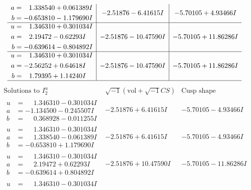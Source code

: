 \documentclass[1p]{elsarticle_modified}
\theoremstyle{definition}
\newcommand{\I}{\sqrt{-1}}
\begin{document}
$$\begin{array}{c|c|c}
\begin{aligned}
a &= \phantom{-}1.338540 + 0.061389 I \\
b &= -0.653810 - 1.179690 I\end{aligned}
 & -2.51876 - 6.41615 I & -5.70105 + 4.93466 I \\ \hline\begin{aligned}
u &= \phantom{-}1.346310 + 0.301034 I \\
a &= \phantom{-}2.19472 - 0.62293 I \\
b &= -0.639614 - 0.804892 I\end{aligned}
 & -2.51876 - 10.47590 I & -5.70105 + 11.86286 I \\ \hline\begin{aligned}
u &= \phantom{-}1.346310 + 0.301034 I \\
a &= -2.56252 + 0.64618 I \\
b &= \phantom{-}1.79395 + 1.14240 I\end{aligned}
 & -2.51876 - 10.47590 I & -5.70105 + 11.86286 I\\
 \hline 
 \end{array}$$\newpage$$\begin{array}{c|c|c}  
\text{Solutions to }I^u_{2}& \I (\text{vol} + \sqrt{-1}CS) & \text{Cusp shape}\\
 \hline 
\begin{aligned}
u &= \phantom{-}1.346310 - 0.301034 I \\
a &= -1.134500 - 0.245507 I \\
b &= \phantom{-}0.368928 - 0.011255 I\end{aligned}
 & -2.51876 + 6.41615 I & -5.70105 - 4.93466 I \\ \hline\begin{aligned}
u &= \phantom{-}1.346310 - 0.301034 I \\
a &= \phantom{-}1.338540 - 0.061389 I \\
b &= -0.653810 + 1.179690 I\end{aligned}
 & -2.51876 + 6.41615 I & -5.70105 - 4.93466 I \\ \hline\begin{aligned}
u &= \phantom{-}1.346310 - 0.301034 I \\
a &= \phantom{-}2.19472 + 0.62293 I \\
b &= -0.639614 + 0.804892 I\end{aligned}
 & -2.51876 + 10.47590 I & -5.70105 - 11.86286 I \\ \hline\begin{aligned}
u &= \phantom{-}1.346310 - 0.301034 I \\

\end{aligned}
\end{array}$$
\end{document}
